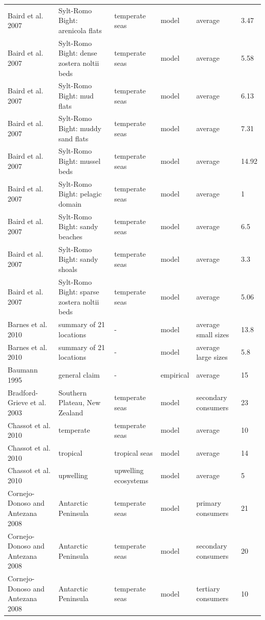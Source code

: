 \documentclass[oneside,12pt,final]{sty/ucthesis-CA2012}
\begin{document}
\begin{mainmatter}
\begin{longtable} {p{3cm}p{3cm}p{1.8cm}lp{2cm}p{1.7cm}}
    Baird et al. 2007  & Sylt-Romo Bight: arenicola flats & temperate seas & model & average & 3.47 \\
    Baird et al. 2007  & Sylt-Romo Bight: dense zostera noltii beds & temperate seas & model & average & 5.58 \\
    Baird et al. 2007  & Sylt-Romo Bight: mud flats & temperate seas & model & average & 6.13 \\
    Baird et al. 2007   & Sylt-Romo Bight: muddy sand flats & temperate seas & model & average & 7.31 \\
    Baird et al. 2007   & Sylt-Romo Bight: mussel beds & temperate seas & model & average & 14.92 \\
    Baird et al. 2007  & Sylt-Romo Bight: pelagic domain & temperate seas & model & average & 1 \\
    Baird et al. 2007  & Sylt-Romo Bight: sandy beaches & temperate seas & model & average & 6.5 \\
    Baird et al. 2007  & Sylt-Romo Bight: sandy shoals & temperate seas & model & average & 3.3 \\
    Baird et al. 2007   & Sylt-Romo Bight: sparse zostera noltii beds & temperate seas & model & average & 5.06 \\
    Barnes et al.  2010  & summary of 21 locations & -    & model & average small sizes & 13.8 \\
    Barnes et al.  2010   & summary of 21 locations & -    & model & average large sizes & 5.8 \\
    Baumann 1995   & general claim & -    & empirical & average & 15 \\
    Bradford-Grieve et al. 2003   & Southern Plateau, New Zealand & temperate seas & model & secondary consumers & 23 \\
    Chassot et al. 2010  & temperate & temperate seas & model & average & 10 \\
    Chassot et al. 2010   & tropical & tropical seas & model & average & 14 \\
    Chassot et al. 2010  & upwelling & upwelling ecosystems & model & average & 5 \\
    Cornejo-Donoso and Antezana 2008   & Antarctic Peninsula & temperate seas & model & primary consumers & 21 \\
    Cornejo-Donoso and Antezana 2008  & Antarctic Peninsula & temperate seas & model & secondary consumers & 20 \\
    Cornejo-Donoso and Antezana 2008  & Antarctic Peninsula & temperate seas & model & tertiary consumers & 10 \\

\end{longtable}
\end{mainmatter}
\end{document}

